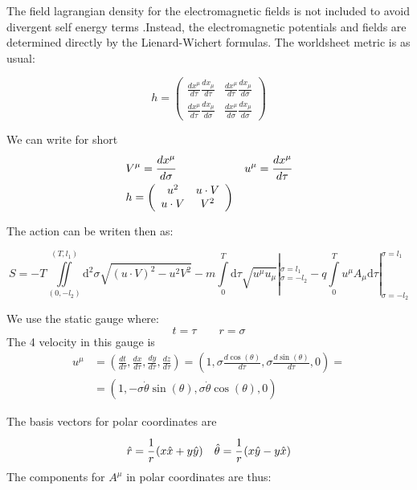 \documentclass[11pt,a4paper]{article}
\begin{document}
The field lagrangian density for the electromagnetic fields is not included to avoid divergent self energy terms .Instead, the electromagnetic potentials and fields are determined directly by the Lienard-Wichert formulas. The worldsheet metric is as usual:

\begin{equation*}
h=
\begin{pmatrix}
\frac{dx^{\mu}}{d\tau}\frac{dx_{\mu}}{d\tau} & \frac{dx^{\mu}}{d\tau}\frac{dx_{\mu}}{d\sigma}\\
\frac{dx^{\mu}}{d\tau}\frac{dx_{\mu}}{d\sigma} & \frac{dx^{\mu}}{d\sigma}\frac{dx_{\mu}}{d\sigma}\end{pmatrix}
\end{equation*} 

We can write for short \begin{align*}
&V^{\mu}=\cfrac{dx^{\mu}}{d\sigma} & u^{\mu}=\cfrac{dx^{\mu}}{d\tau} \\
&h=\left(\begin{array}{cc} u^{2} & u\cdot V\\ u\cdot V & V^{2} \end{array}\right)
\end{align*} 

The action can be writen then as:

\begin{equation}
S=-T\iint\limits_{(0,-l_{2})}^{(T,l_{1})}\mathrm{d}^{2}\sigma\sqrt{\left(u\cdot V\right)^{2}-u^{2}V^{2}}-m\int\limits_{0}^{T}\mathrm{d}\tau\sqrt{u^{\mu}u_{\mu}}|_{\sigma=-l_{2}}^{\sigma=l_{1}}-q\int\limits_{0}^{T}u^{\mu}A_{\mu}\mathrm{d}\tau|_{\sigma=-l_{2}}^{\sigma=l_{1}} 
\end{equation}
 
We use the static gauge where:
\begin{equation}
\label{eq:staticqauge}
t=\tau \qquad r=\sigma
\end{equation}
The 4 velocity in this gauge is
\begin{align*}
u^{\mu}&=\left(\frac{dt}{d\tau},\frac{dx}{d\tau},\frac{dy}{d\tau},\frac{dz}{d\tau}\right)
=\left(1,\sigma\frac{d\cos\left(\theta\right)}{d\tau},\sigma\frac{d\sin\left(\theta\right)}{d\tau},0\right)=\\
&=\left(1,-\sigma\dot{\theta}\sin\left(\theta\right),\sigma\dot{\theta}\cos\left(\theta\right),0\right)
\end{align*}

The basis vectors for polar coordinates are
\begin{align*}
&\hat{r}=\cfrac{1}{r}\left(x\hat{x}+y\hat{y}\right) & \hat{\theta}=\cfrac{1}{r}\left(x\hat{y}-y\hat{x}\right)
\end{align*}
The components for $ A^{\mu} $ in polar coordinates are thus:
\end{document}
